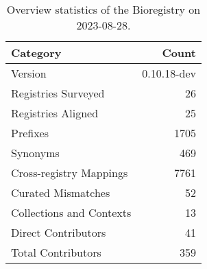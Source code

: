 \begin{table}
\caption{Overview statistics of the Bioregistry on 2023-08-28.}
\label{tab:bioregistry-summary}
\begin{tabular}{lr}
\toprule
Category & Count \\
\midrule
Version & 0.10.18-dev \\
Registries Surveyed & 26 \\
Registries Aligned & 25 \\
Prefixes & 1705 \\
Synonyms & 469 \\
Cross-registry Mappings & 7761 \\
Curated Mismatches & 52 \\
Collections and Contexts & 13 \\
Direct Contributors & 41 \\
Total Contributors & 359 \\
\bottomrule
\end{tabular}
\end{table}
